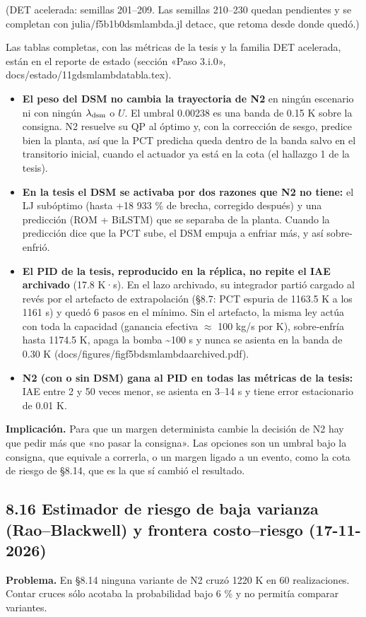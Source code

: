 \documentclass[11pt,a4paper]{article}
\newcommand{\codeus}{\textunderscore\allowbreak}
\newcommand{\code}[1]{{\small\ttfamily\let\_\codeus #1}}
\begin{document}
(DET acelerada: semillas 201–209. Las semillas 210–230 quedan pendientes y se completan con \code{julia/f5b1b0\_dsm\_lambda.jl detacc}, que retoma desde donde quedó.)

Las tablas completas, con las métricas de la tesis y la familia DET acelerada, están en el reporte de estado (sección «Paso 3.i.0», \code{docs/estado/11g\_dsm\_lambda\_tabla.tex}).

\begin{itemize}
\item \textbf{El peso del DSM no cambia la trayectoria de N2} en ningún escenario ni con ningún $\lambda_{\rm dsm}$ o $U$. El umbral 0.00238 es una banda de 0.15 K sobre la consigna. N2 resuelve su QP al óptimo y, con la corrección de sesgo, predice bien la planta, así que la PCT predicha queda dentro de la banda salvo en el transitorio inicial, cuando el actuador ya está en la cota (el hallazgo 1 de la tesis).
\item \textbf{En la tesis el DSM se activaba por dos razones que N2 no tiene:} el LJ subóptimo (hasta +18 933 \% de brecha, corregido después) y una predicción (ROM + BiLSTM) que se separaba de la planta. Cuando la predicción dice que la PCT sube, el DSM empuja a enfriar más, y así sobre-enfrió.
\item \textbf{El PID de la tesis, reproducido en la réplica, no repite el IAE archivado} (17.8 K·s). En el lazo archivado, su integrador partió cargado al revés por el artefacto de extrapolación (\S{}8.7: PCT espuria de 1163.5 K a los 1161 s) y quedó 6 pasos en el mínimo. Sin el artefacto, la misma ley actúa con toda la capacidad (ganancia efectiva $\approx$ 100 kg/s por K), sobre-enfría hasta 1174.5 K, apaga la bomba \textasciitilde{}100 s y nunca se asienta en la banda de 0.30 K (\code{docs/figures/fig\_f5b\_dsm\_lambda\_archived.pdf}).
\item \textbf{N2 (con o sin DSM) gana al PID en todas las métricas de la tesis:} IAE entre 2 y 50 veces menor, se asienta en 3–14 s y tiene error estacionario de 0.01 K.
\end{itemize}

\textbf{Implicación.} Para que un margen determinista cambie la decisión de N2 hay que pedir más que «no pasar la consigna». Las opciones son un umbral bajo la consigna, que equivale a correrla, o un margen ligado a un evento, como la cota de riesgo de \S{}8.14, que es la que sí cambió el resultado.

\subsection*{8.16 Estimador de riesgo de baja varianza (Rao–Blackwell) y frontera costo–riesgo (17-11-2026)}
\textbf{Problema.} En \S{}8.14 ninguna variante de N2 cruzó 1220 K en 60 realizaciones. Contar cruces sólo acotaba la probabilidad bajo 6 \% y no permitía comparar variantes.
\end{document}
